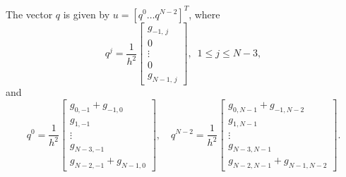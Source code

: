 
 The vector $q$ is given by $u = [q^0 \ldots q^{N-2}]^T$, %
 where 
 \[
 q^j = \frac{1}{h^2}
 \begin{bmatrix} g_{-1,\,j} \\ 0 \\ \vdots \\0\\ g_{N-1,\,j} \end{bmatrix} , \,\,\, 1 \leq j \leq N-3,
 \]
 and 
 \[
 q^0 = \frac{1}{h^2}\begin{bmatrix} g_{0,-1} + g_{-1,0} \\ g_{1,-1} \\ \vdots \\ g_{N-3,-1}\\ g_{N-2,-1} + g_{N-1,0}\end{bmatrix}, \quad q^{N-2} = \frac{1}{h^2}\begin{bmatrix} g_{0,N-1} + g_{-1,N-2}\\ g_{1,N-1} \\ \vdots \\ g_{N-3,N-1}\\ g_{N-2,N-1} + g_{N-1,N-2}\end{bmatrix}.
 \]



% 	 

